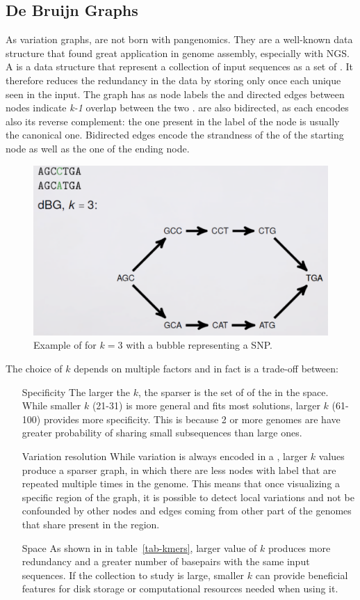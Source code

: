 \subsection{De Bruijn Graphs}
As variation graphs, \dbgs are not born with pangenomics. They are a well-known data structure that found great application in genome assembly, especially with NGS.
A \dbg is a data structure that represent a collection of input sequences as a set of \kmers. It therefore reduces the redundancy in the data by storing only once each unique \kmer seen in the input. The graph has as node labels the \kmers and directed edges between nodes indicate \emph{k-1} overlap between the two \kmers. \dbgs are also bidirected, as each \kmer encodes also its reverse complement: the one present in the label of the node is usually the canonical one. Bidirected edges encode the strandness of the \kmer of the starting node as well as the one of the ending node. 
\begin{figure}[h!]
	\centering
	\includegraphics[width=.95\linewidth]{figures/background/dbg.png}
	\caption[Example of \dbg.]{Example of \dbg for $k=3$ with a bubble representing a SNP.}
	\label{fig:dbg_ex}
\end{figure}
The choice of $k$ depends on multiple factors and in fact is a trade-off between: 
\begin{itemize}
	\item[Specificity] The larger the $k$, the sparser is the set of \kmers of the \dbg in the space. While smaller $k$ (21-31) is more general and fits most solutions, larger $k$ (61-100) provides more specificity. This is because 2 or more genomes are have greater probability of sharing small subsequences than large ones.
	\item[Variation resolution] While variation is always encoded in a \dbg, larger $k$ values produce a sparser graph, in which there are less nodes with label \kmers that are repeated multiple times in the genome. This means that once visualizing a specific region of the graph, it is possible to detect local variations and not be confounded by other nodes and edges coming from other part of the genomes that share \kmers present in the region.
	\item[Space] As shown in in table~\ref{tab-kmers}, larger value of $k$ produces more redundancy and a greater number of basepairs with the same input sequences. If the collection to study is large, smaller $k$ can provide beneficial features for disk storage or computational resources needed when using it.
\end{itemize}

